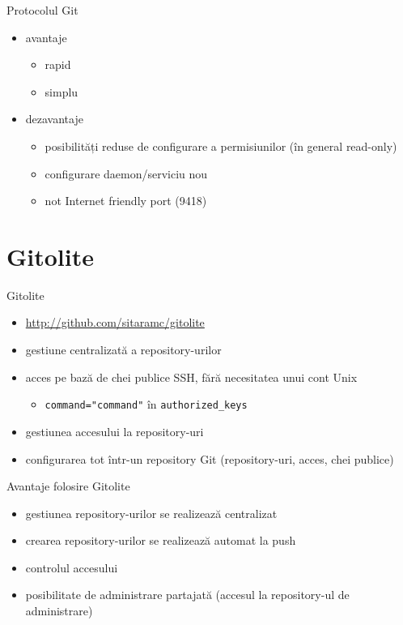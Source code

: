 \documentclass{beamer}
\begin{document}
\begin{frame}{Protocolul Git}
	\begin{itemize}
		\item avantaje
          \begin{itemize}
            \item rapid
            \item simplu
          \end{itemize}
		\item dezavantaje
          \begin{itemize}
            \item posibilități reduse de configurare a permisiunilor (în
            general read-only)
            \item configurare daemon/serviciu nou
            \item not Internet friendly port (9418)
          \end{itemize}
	\end{itemize}
\end{frame}

\section{Gitolite}

\begin{frame}{Gitolite}
	\begin{itemize}
		\item \url{http://github.com/sitaramc/gitolite}
        \item gestiune centralizată a repository-urilor
        \item acces pe bază de chei publice SSH, fără necesitatea unui cont Unix
          \begin{itemize}
            \item \texttt{command="command"} în \texttt{authorized\_keys}
          \end{itemize}
        \item gestiunea accesului la repository-uri
        \item configurarea tot într-un repository Git (repository-uri, acces,
        chei publice)
	\end{itemize}
\end{frame}

\begin{frame}{Avantaje folosire Gitolite}
	\begin{itemize}
		\item gestiunea repository-urilor se realizează centralizat
		\item crearea repository-urilor se realizează automat la push
        \item controlul accesului
        \item posibilitate de administrare partajată (accesul la repository-ul
        de administrare)
	\end{itemize}
\end{frame}
\end{document}
